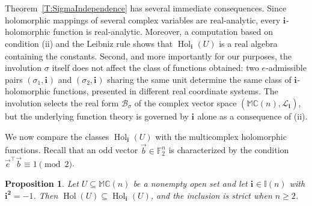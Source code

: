\documentclass[12pt]{amsart}
\theoremstyle{plain}
\newtheorem{proposition}[theorem]{Proposition}
\theoremstyle{definition}
\numberwithin{equation}{section}
\newcommand{\im}[1]{\mathbf{ i_{#1}}}
\newcommand{\ims}[1]{\mathbf{ i_{#1}^2}}
\newcommand{\mC}{\mathbb{C}}
\newcommand{\mM}{\mathbb{M}}
\newcommand{\mI}{\mathbb{I}}
\newcommand{\cL}{\mathcal{L}}
\newcommand{\cB}{\mathcal{B}}
\DeclareMathOperator{\hol}{Hol}
\begin{document}
Theorem~\ref{T:SigmaIndependence} has several immediate consequences. Since holomorphic mappings of several complex variables are real-analytic, every $\im{}$-holomorphic function is real-analytic. 
Moreover, a computation based on condition (ii) and the Leibniz rule shows that $\hol_{\im{}} (U)$ is a real algebra containing the constants. Second, and more importantly for our purposes, the involution $\sigma$ itself does not affect the class of functions obtained: two $e$-admissible pairs $(\sigma_1 , \im{})$ and $(\sigma_2 , \im{})$ sharing the same unit determine the same class of $\im{}$-holomorphic functions, presented in different real coordinate systems. The involution selects the real form $\cB_\sigma$ of the complex vector space $(\mM \mC(n) , \cL_{\im{}})$, but the underlying function theory is governed by $\im{}$ alone as a consequence of (ii). 

We now compare the classes $\hol_{\im{}} (U)$ with the multicomplex holomorphic functions. Recall that an odd vector $\vec{b} \in \mathbb{F}_2^n$ is characterized by the condition $\vec{e}^\top \vec{b} \equiv 1 \pmod 2$. 

    \begin{proposition}\label{P:HoloInclusion}
    Let $U \subseteq \mM \mC(n)$ be a nonempty open set and let $\im{}\in\mI(n)$ with $\ims{}=-1$. Then $\hol(U)\subseteq\hol_{\im{}}(U)$, and the inclusion is strict when $n\geq2$.
    \end{proposition}
\end{document}
